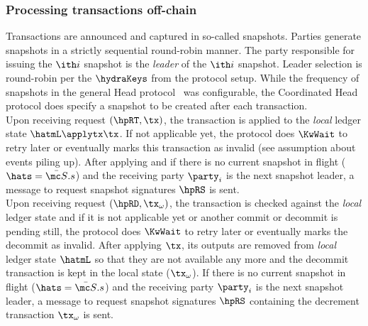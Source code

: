 \subsubsection{Processing transactions off-chain}

Transactions are announced and captured in so-called snapshots. Parties generate
snapshots in a strictly sequential round-robin manner. The party responsible for
issuing the $\ith i$ snapshot is the \emph{leader} of the $\ith i$ snapshot.
Leader selection is round-robin per the $\hydraKeys$ from the protocol setup.
While the frequency of snapshots in the general Head protocol~\cite{hydrahead20}
was configurable, the Coordinated Head protocol does specify a snapshot to be
created after each transaction.\\

\quad Upon receiving request $(\hpRT,\tx)$, the transaction is
applied to the \emph{local} ledger state $\hatmL \applytx \tx$. If not
applicable yet, the protocol does $\KwWait$ to retry later or eventually marks
this transaction as invalid (see assumption about events piling up). After
applying and if there is no current snapshot in flight ($\hats = \bar{\mc S}.s$) and the
receiving party $\party_{i}$ is the next snapshot
leader, a message to request snapshot signatures $\hpRS$ is sent. \\

\quad Upon receiving request $(\hpRD,\tx_\omega)$, the transaction
is checked against the \emph{local} ledger state and if it is not applicable yet
or another commit or decommit is pending still, the protocol does $\KwWait$ to
retry later or eventually marks the decommit as invalid. After applying $\tx$,
its outputs are removed from \emph{local} ledger state $\hatmL$ so that they are
not available any more and the decommit transaction is kept in the local state
($\tx_\omega$). If there is no current snapshot in flight ($\hats = \bar{\mc S}.s$)
and the receiving party $\party_{i}$ is the next snapshot leader, a message to
request snapshot signatures $\hpRS$ containing the decrement transaction $\tx_\omega$ is sent. \\

  \\

